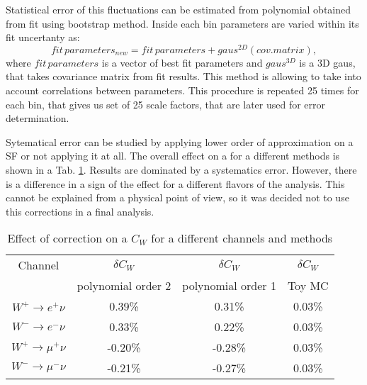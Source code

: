 \begin{figure}[!tbp]
\begin{minipage}[h]{0.49\linewidth}
\end{minipage}
\hfill
\begin{minipage}[h]{0.49\linewidth}
\end{minipage}
\caption{}
\label{HadrRecoil:PtSpectrum}
\end{figure}

Statistical error of this fluctuations can be estimated from polynomial  obtained from fit using bootstrap method. Inside each bin parameters are varied within its fit uncertanty as:
\begin{equation}
fit\, parameters_{new} = fit\, parameters + gaus^{2D}(cov.matrix),
\end{equation}
where $fit\, parameters$  is a vector of best fit parameters and $gaus^{3D}$ is a 3D gaus, that takes covariance matrix from fit results. This method is allowing to take into account correlations between parameters. This procedure is repeated 25 times for each bin, that gives us set of 25 scale factors, that are later used for error determination.

Sytematical error can be studied by applying lower order of approximation on a SF or not applying it at all. The overall effect on a \cw for a different methods is shown in a Tab. \ref{SumetCW}. Results are dominated by a systematics error. However, there is a difference in a sign of the effect for a different flavors of the analysis. This cannot be explained from a physical point of view, so it was decided not to use this corrections in a final analysis.

 \begin{table}
 \caption{Effect of \sumet correction on a $C_{W}$ for a different channels and methods}
\label{SumetCW}
\begin{center}
\begin{tabular}{c | c |  c |  c   }
\hline
Channel & $\delta C_W$ & $\delta C_W$ & $\delta C_W$ \\
& polynomial order 2 & polynomial order 1 & Toy MC \\
\hline
\hline
$W^{+} \to e^{+}\nu$ & 0.39\%  & 0.31\% & 0.03\% \\
$W^{-} \to e^{-}\nu$ & 0.33\%  & 0.22\% & 0.03\% \\
$W^{+} \to \mu^{+}\nu$ & -0.20\%  & -0.28\% & 0.03\% \\
$W^{-} \to \mu^{-}\nu$ & -0.21\%  & -0.27\% & 0.03\% \\
\hline
\end{tabular}
\end{center}

\end{table}


